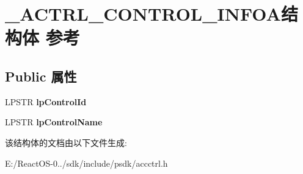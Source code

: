 \hypertarget{struct___a_c_t_r_l___c_o_n_t_r_o_l___i_n_f_o_a}{}\section{\+\_\+\+A\+C\+T\+R\+L\+\_\+\+C\+O\+N\+T\+R\+O\+L\+\_\+\+I\+N\+F\+O\+A结构体 参考}
\label{struct___a_c_t_r_l___c_o_n_t_r_o_l___i_n_f_o_a}
\subsection*{Public 属性}
\begin{DoxyCompactItemize}
\item 
\mbox{\label{struct___a_c_t_r_l___c_o_n_t_r_o_l___i_n_f_o_a_aac9a7809b7fa24be0aa95ea728d42076}} 
L\+P\+S\+TR {\bfseries lp\+Control\+Id}
\item 
\mbox{\label{struct___a_c_t_r_l___c_o_n_t_r_o_l___i_n_f_o_a_aed4f07903b484b867f4944128d216c63}} 
L\+P\+S\+TR {\bfseries lp\+Control\+Name}
\end{DoxyCompactItemize}


该结构体的文档由以下文件生成\+:\begin{DoxyCompactItemize}
\item 
E\+:/\+React\+O\+S-\/0../sdk/include/psdk/accctrl.\+h\end{DoxyCompactItemize}
